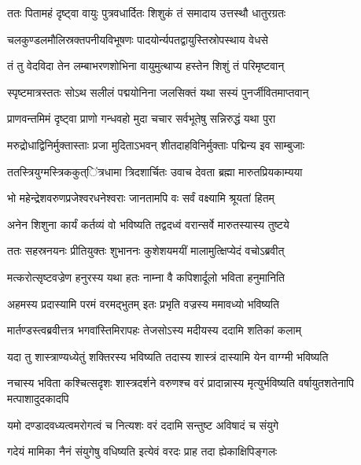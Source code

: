 
\twolineshloka
{ततः पितामहं दृष्ट्वा वायुः पुत्रवधार्दितः}
{शिशुकं तं समादाय उत्तस्थौ धातुरग्रतः} %

\twolineshloka
{चलकुण्डलमौलिस्रक्तपनीयविभूषणः}
{पादयोर्न्यपतद्वायुस्तिस्रोपस्थाय वेधसे} %

\twolineshloka
{तं तु वेदविदा तेन लम्बाभरणशोभिना}
{वायुमुत्थाप्य हस्तेन शिशुं तं परिमृष्टवान्} %

\twolineshloka
{स्पृष्टमात्रस्ततः सोऽथ सलीलं पद्मयोनिना}
{जलसिक्तं यथा सस्यं पुनर्जीवितमाप्तवान्} %

\twolineshloka
{प्राणवन्तमिमं दृष्ट्वा प्राणो गन्धवहो मुदा}
{चचार सर्वभूतेषु सन्निरुद्धं यथा पुरा} %

\twolineshloka
{मरुद्रोधाद्विनिर्मुक्तास्ताः प्रजा मुदिताऽभवन्}
{शीतदाहविनिर्मुक्ताः पद्मिन्य इव साम्बुजाः} %

\twolineshloka
{ततस्त्रियुग्मस्त्रिककुत्ऺित्रधामा त्रिदशार्चितः}
{उवाच देवता ब्रह्मा मारुतप्रियकाम्यया} %

\twolineshloka
{भो महेन्द्रेशवरुणप्रजेश्वरधनेश्वराः}
{जानतामपि वः सर्वं वक्ष्यामि श्रूयतां हितम्} %

\twolineshloka
{अनेन शिशुना कार्यं कर्तव्यं वो भविष्यति}
{तद्वदध्वं वरान्सर्वे मारुतस्यास्य तुष्टये} %

\twolineshloka
{ततः सहस्रनयनः प्रीतियुक्तः शुभाननः}
{कुशेशयमयीं मालामुत्क्षिप्येदं वचोऽब्रवीत्} %

\twolineshloka
{मत्करोत्सृष्टवज्रेण हनुरस्य यथा हतः}
{नाम्ना वै कपिशार्दूलो भविता हनुमानिति} %

\twolineshloka
{अहमस्य प्रदास्यामि परमं वरमद्भुतम्}
{इतः प्रभृति वज्रस्य ममावध्यो भविष्यति} %

\twolineshloka
{मार्तण्डस्त्वब्रवीत्तत्र भगवांस्तिमिरापहः}
{तेजसोऽस्य मदीयस्य ददामि शतिकां कलाम्} %

\twolineshloka
{यदा तु शास्त्राण्यध्येतुं शक्तिरस्य भविष्यति}
{तदास्य शास्त्रं दास्यामि येन वाग्ग्मी भविष्यति} %

\threelineshloka
{नचास्य भविता कश्चित्सदृशः शास्त्रदर्शने}
{वरुणश्च वरं प्रादान्नास्य मृत्युर्भविष्यति}
{वर्षायुतशतेनापि मत्पाशादुदकादपि} %

\twolineshloka
{यमो दण्डादवध्यत्वमरोगत्वं च नित्यशः}
{वरं ददामि सन्तुष्ट अविषादं च संयुगे} %

\twolineshloka
{गदेयं मामिका नैनं संयुगेषु वधिष्यति}
{इत्येवं वरदः प्राह तदा ह्येकाक्षिपिङ्गलः} %


